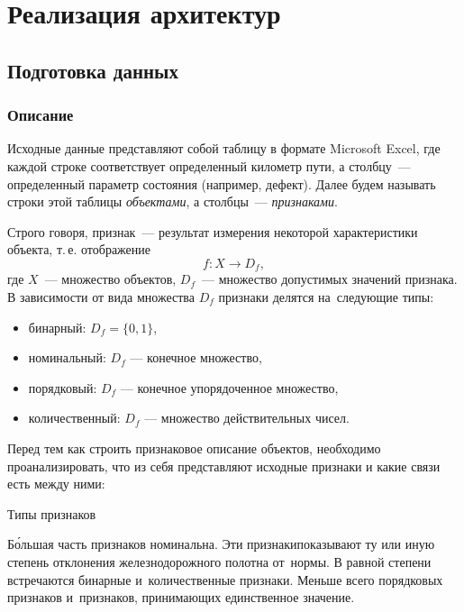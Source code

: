 \chapter{Реализация архитектур}

\section{Подготовка данных}

\subsection{Описание}

Исходные данные представляют собой таблицу в формате Microsoft Excel, где каждой строке соответствует определенный километр пути,
а столбцу~--- определенный параметр состояния (например, дефект). Далее будем называть строки этой таблицы 
\textit{объектами}, а столбцы~--- \textit{признаками}.

Строго говоря, признак~--- результат измерения некоторой характеристики объекта, т.\,е. отображение
\begin{equation*}\label{def_feature}
		f: X \rightarrow D_f,
\end{equation*}
где $ X $~--- множество объектов, $ D_f $~--- множество допустимых значений признака.
В зависимости от вида множества $ D_f $ признаки делятся на~следующие типы:
\begin{itemize}[noitemsep, wide]
	\item бинарный: $ D_{f}=\{0,1\} $,
	\item номинальный: $ D_f $ — конечное множество,
	\item порядковый: $ D_f $ — конечное упорядоченное множество,
	\item количественный: $ D_f $ — множество действительных чисел.
\end{itemize}

Перед тем как строить признаковое описание объектов, необходимо проанализировать, что
из себя представляют исходные признаки и какие связи есть между ними:
\begin{table}[!h]\centering
	\vspace{-2mm}
	\caption{Типы признаков}\medskip
	
	
	\vspace{-3mm}
\end{table}

Б\'{о}льшая часть признаков номинальна. Эти признаки\linebreak показывают
ту или иную степень отклонения железнодорожного полотна от~нормы. В равной степени встречаются бинарные и~количественные
признаки. Меньше всего порядковых признаков и~признаков, принимающих единственное значение.

